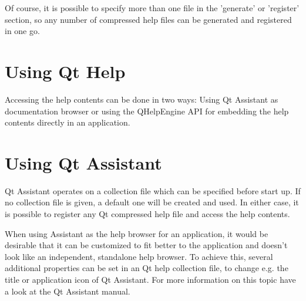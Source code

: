 Of course, it is possible to specify more than one file in the 'generate' or 'register' section, so any number of compressed help files can be generated and registered in one go.\hypertarget{collection_collection_usinghelp}{}\section{Using Qt Help}\label{collection_collection_usinghelp}
Accessing the help contents can be done in two ways\-: Using Qt Assistant as documentation browser or using the Q\-Help\-Engine A\-P\-I for embedding the help contents directly in an application.\hypertarget{collection_collection_usingassistant}{}\section{Using Qt Assistant}\label{collection_collection_usingassistant}
Qt Assistant operates on a collection file which can be specified before start up. If no collection file is given, a default one will be created and used. In either case, it is possible to register any Qt compressed help file and access the help contents.

When using Assistant as the help browser for an application, it would be desirable that it can be customized to fit better to the application and doesn't look like an independent, standalone help browser. To achieve this, several additional properties can be set in an Qt help collection file, to change e.\-g. the title or application icon of Qt Assistant. For more information on this topic have a look at the Qt Assistant manual. 